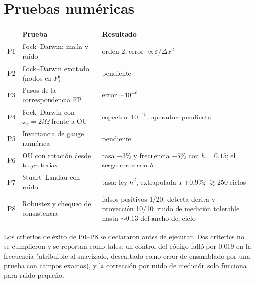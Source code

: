 \documentclass[11pt,a4paper]{article}
\begin{document}
\section{Pruebas num\'ericas}
\begin{center}
\begin{tabular}{@{}p{0.6cm} p{7.2cm} p{5.2cm}@{}}
\toprule
& Prueba & Resultado \\
\midrule
P1 & Fock--Darwin: malla y ruido & orden 2; error $\propto\varepsilon/\Delta x^2$ \\
P2 & Fock--Darwin excitado (nodos en $P$) & pendiente \\
P3 & Pasos de la correspondencia FP & error $\sim10^{-6}$ \\
P4 & Fock--Darwin con $\omega_c=2i\Omega$ frente a OU & espectro: $10^{-15}$; operador: pendiente \\
P5 & Invariancia de gauge num\'erica & pendiente \\
P6 & OU con rotaci\'on desde trayectorias & tasa $-3\%$ y frecuencia $-5\%$ con $h=0.15$; el sesgo crece con $h$ \\
P7 & Stuart--Landau con ruido & tasa: ley $h^2$, extrapolada a $+0.9\%$; $\gtrsim250$ ciclos \\
P8 & Robustez y chequeo de consistencia & falsos positivos 1/20; detecta deriva y proyecci\'on 10/10; ruido de medici\'on tolerable hasta $\sim0.13$ del ancho del ciclo \\
\bottomrule
\end{tabular}
\end{center}
Los criterios de \'exito de P6--P8 se declararon antes de ejecutar. Dos criterios no se cumplieron y se
reportan como tales: un control del c\'odigo fall\'o por 0.009 en la frecuencia (atribuible al suavizado,
descartado como error de ensamblado por una prueba con campos exactos), y la correcci\'on por ruido de
medici\'on solo funciona para ruido peque\~no.
\end{document}
